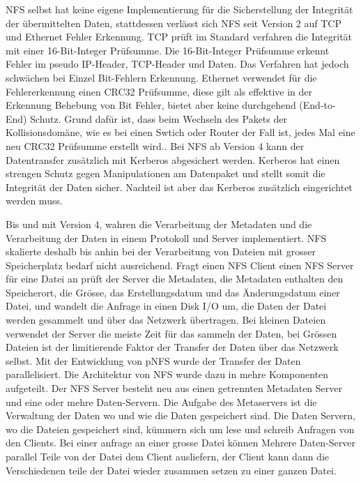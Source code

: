 NFS selbst hat keine eigene Implementierung für die Sicherstellung der Integrität der übermittelten Daten, stattdessen verlässt sich NFS seit Version 2 auf TCP und Ethernet Fehler Erkennung. TCP prüft im Standard verfahren die Integrität mit einer 16-Bit-Integer Prüfsumme. Die 16-Bit-Integer Prüfsumme erkennt Fehler im pseudo IP-Header, TCP-Header und Daten. Das Verfahren hat jedoch schwächen bei Einzel Bit-Fehlern Erkennung. Ethernet verwendet für die Fehlererkennung einen CRC32 Prüfsumme, diese gilt als effektive in der Erkennung Behebung von Bit Fehler, bietet aber keine durchgehend (End-to-End) Schutz. Grund dafür ist, dass beim Wechseln des Pakets der Kollisionsdomäne, wie es bei einen Swtich oder Router der Fall ist, jedes Mal eine neu CRC32 Prüfsumme erstellt wird.\cite{JohnL.202}. Bei NFS ab Version 4 kann der Datentransfer zusätzlich mit Kerberos abgesichert werden. Kerberos hat einen strengen Schutz gegen Manipulationen am Datenpaket und stellt somit die Integrität der Daten sicher. Nachteil ist aber das Kerberos zusätzlich eingerichtet werden muss. 

Bis und mit Version 4, wahren die Verarbeitung der Metadaten und die Verarbeitung der Daten in einem Protokoll und Server implementiert. NFS skalierte deshalb bis anhin bei der Verarbeitung von Dateien mit grosser Speicherplatz bedarf nicht ausreichend. Fragt einen NFS Client einen NFS Server für eine Datei an prüft der Server die Metadaten, die Metadaten enthalten den Speicherort, die Grösse, das Erstellungsdatum und das Änderungsdatum einer Datei, und wandelt die Anfrage in einen Disk I/O um, die Daten der Datei werden gesammelt und über das Netzwerk übertragen. Bei kleinen Dateien verwendet der Server die meiste Zeit für das sammeln der Daten, bei Grössen Dateien ist der limitierende Faktor der Transfer der Daten über das Netzwerk selbst.
Mit der Entwicklung von pNFS wurde der Transfer der Daten parallelisiert. Die Architektur von NFS wurde dazu in mehre Komponenten aufgeteilt. Der NFS Server besteht neu aus einen getrennten Metadaten Server und eine oder mehre Daten-Servern. Die Aufgabe des Metaservers ist die Verwaltung der Daten wo und wie die Daten gespeichert sind. Die Daten Servern, wo die Dateien gespeichert sind, kümmern sich um lese und schreib Anfragen von den Clients.
Bei einer anfrage an einer grosse Datei können Mehrere Daten-Server parallel Teile von der Datei dem Client ausliefern, der Client kann dann die Verschiedenen teile der Datei wieder zusammen setzen zu einer ganzen Datei. \cite{Shepler2010}\cite{Group2010}

